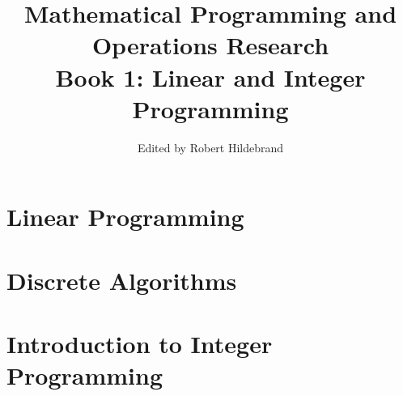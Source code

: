 \documentclass{book}
\title{Mathematical Programming and Operations Research\\
       \large Book 1: Linear and Integer Programming}
\author{Edited by Robert Hildebrand}
\date{}
\begin{document}
\frontmatter
\maketitle




\tableofcontents


\mainmatter



\part{Linear Programming}















\part{Discrete Algorithms}


\part{Introduction to Integer Programming}
\label{part:IntroIntegerProgramming}


\appendix































\backmatter




\end{document}
